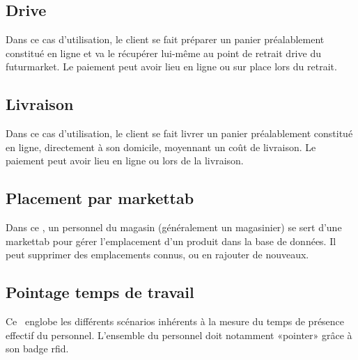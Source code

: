\subsection{Drive}
Dans ce cas d'utilisation, le client se fait préparer un panier préalablement constitué en ligne et va le récupérer lui-même au point de retrait drive du futurmarket.
Le paiement peut avoir lieu en ligne ou sur place lors du retrait.

\subsection{Livraison}
Dans ce cas d'utilisation, le client se fait livrer un panier préalablement constitué en ligne, directement à son domicile, moyennant un coût de livraison.
Le paiement peut avoir lieu en ligne ou lors de la livraison.

\subsection{Placement par markettab}
Dans ce \cu, un personnel du magasin (généralement un magasinier) se sert d'une markettab pour gérer l'emplacement d'un produit dans la base de données.
Il peut supprimer des emplacements connus, ou en rajouter de nouveaux.

\subsection{Pointage temps de travail}
Ce \cu\ englobe les différents scénarios inhérents à la mesure du temps de présence effectif du personnel.
L'ensemble du personnel doit notamment «pointer» grâce à son badge rfid.
